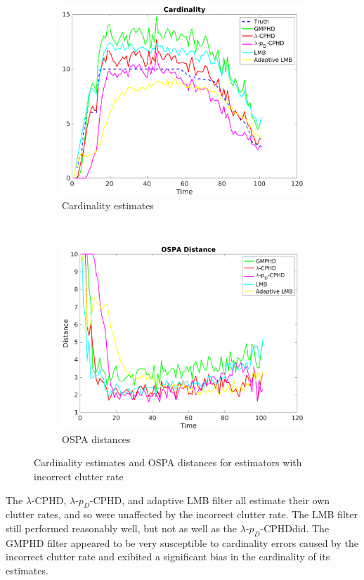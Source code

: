 \documentclass{article}
\newcommand{\lcphd}{$\lambda$-CPHD}
\newcommand{\lpdcphd}{$\lambda$-$p_D$-CPHD}
\begin{document}
\begin{figure}[H]
  \centering
  \begin{subfigure}[t]{0.49\textwidth}
    \centering
    \includegraphics[width=1\linewidth]{low_clutter/cardinality.png}
    \caption{Cardinality estimates}
  \end{subfigure}%
  ~ 
  \begin{subfigure}[t]{0.49\textwidth}
    \centering
    \includegraphics[width=1\linewidth]{low_clutter/ospa.png}
    \caption{OSPA distances}
  \end{subfigure}
\caption{Cardinality estimates and OSPA distances for estimators with incorrect clutter rate}
\end{figure}
The \lcphd, \lpdcphd, and adaptive LMB filter all estimate their own clutter rates, and so were unaffected by the incorrect clutter rate. The LMB filter still performed reasonably well, but not as well as the \lpdcphd did. The GMPHD filter appeared to be very susceptible to cardinality errors caused by the incorrect clutter rate and exibited a significant bias in the cardinality of its estimates.
\end{document}
